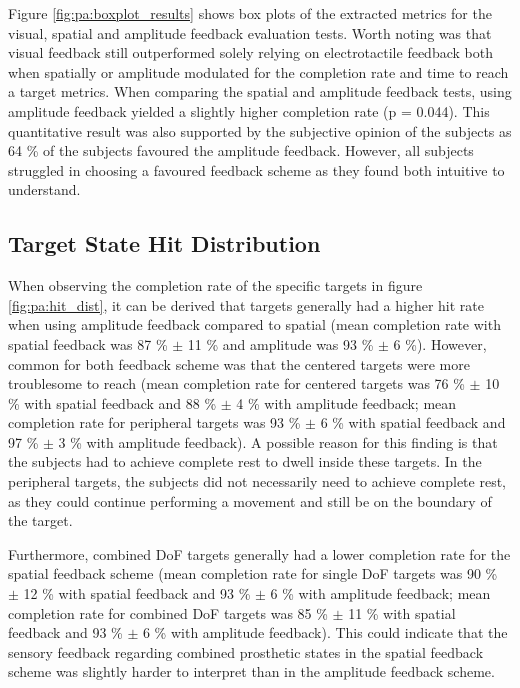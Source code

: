 Figure \ref{fig:pa:boxplot_results} shows box plots of the extracted metrics for the visual, spatial and amplitude feedback evaluation tests. Worth noting was that visual feedback still outperformed solely relying on electrotactile feedback both when spatially or amplitude modulated for the completion rate and time to reach a target metrics. When comparing the spatial and amplitude feedback tests, using amplitude feedback yielded a slightly higher completion rate (p = 0.044). This quantitative result was also supported by the subjective opinion of the subjects as 64 \% of the subjects favoured the amplitude feedback. However, all subjects struggled in choosing a favoured feedback scheme as they found both intuitive to understand. 


\subsection{Target State Hit Distribution}

When observing the completion rate of the specific targets in figure \ref{fig:pa:hit_dist}, it can be derived that targets generally had a higher hit rate when using amplitude feedback compared to spatial (mean completion rate with spatial feedback was 87 \% $\pm$ 11 \% and amplitude was 93 \% $\pm$ 6 \%). However, common for both feedback scheme was that the centered targets were more troublesome to reach (mean completion rate for centered targets was 76 \% $\pm$ 10 \%  with spatial feedback and 88 \%  $\pm$ 4 \% with amplitude feedback; mean completion rate for peripheral targets was 93 \% $\pm$ 6 \% with spatial feedback and 97 \% $\pm$ 3 \% with amplitude feedback). A possible reason for this finding is that the subjects had to achieve complete rest to dwell inside these targets. In the peripheral targets, the subjects did not necessarily need to achieve complete rest, as they could continue performing a movement and still be on the boundary of the target. 

Furthermore, combined DoF targets generally had a lower completion rate for the spatial feedback scheme (mean completion rate for single DoF targets was 90 \% $\pm$ 12 \% with spatial feedback and 93 \% $\pm$ 6 \% with amplitude feedback; mean completion rate for combined DoF targets was 85 \% $\pm$ 11 \% with spatial feedback and 93 \% $\pm$ 6 \% with amplitude feedback). This could indicate that the sensory feedback regarding combined prosthetic states in the spatial feedback scheme was slightly harder to interpret than in the amplitude feedback scheme. 


